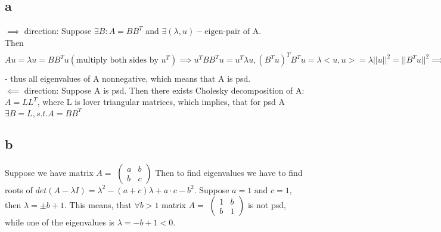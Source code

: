 \subsection*{a}
$\implies$ direction: Suppose 
$\exists B: A = B B^T$ and 
$\exists (\lambda, u) - \text{eigen-pair of A}$.\\ 
Then 
$Au = \lambda  u = BB^Tu (\text{multiply both sides by $u^T$})\implies u^TBB^Tu = u^T\lambda u, (B^Tu)^T B^Tu = \lambda <u,u> = \lambda ||u||^2 = ||B^Tu||^2 \implies \lambda = \dfrac {||B^Tu||^2}{||u||^2} \geq 0$ 
- thus all eigenvalues of A nonnegative, which means that A is psd.\\
$\impliedby$ direction: Suppose A is psd. Then there exists Cholesky decomposition of A: $A = LL^T$, where L is lover triangular matrices, which implies, that for psd A $\exists B = L, s.t. A = BB^T$
\subsection*{b}
Suppose we have matrix $A = $ 
$\begin{pmatrix}
a & b\\
b & c
\end{pmatrix}$
Then to find eigenvalues we have to find roots of $det(A - \lambda I) = \lambda^2 - (a+c)\lambda + a\cdot c - b^2$.
Suppose $a = 1 \text{ and } c = 1$, then $\lambda = \pm b + 1$. This means, that $\forall b > 1$ matrix $A = $
$\begin{pmatrix}
1 & b\\
b & 1
\end{pmatrix}$
 is not psd, while one of the eigenvalues is $\lambda = -b + 1 < 0$.